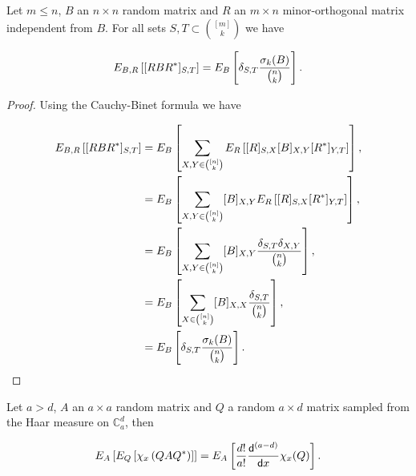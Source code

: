 \begin{lemma} \label{lemma:conjugate_minorth}
    Let $m \le n$, $B$ an $n\times n$ random matrix and $R$ an $m\times n$ minor-orthogonal matrix independent from $B$. For all sets $S,T \subset \binom{[m]}{k}$ we have

    \begin{equation*}
        E_{B,R} \left[ [RBR^*]_{S,T} \right] = E_B \left[\delta_{S,T} \frac{\sigma_k(B)}{\binom{n}k}\right].
    \end{equation*}
\end{lemma}

\begin{proof}
    Using the Cauchy-Binet formula we have

    \begin{align*}
        E_{B,R} \left[ [RBR^*]_{S,T} \right] &= E_B \left[\sum_{X,Y \in \binom{[n]}{k}} E_R \left[ [R]_{S,X} [B]_{X,Y} [R^*]_{Y,T} \right] \right],\\ 
        &= E_B \left[\sum_{X,Y \in \binom{[n]}{k}} [B]_{X,Y} E_R \left[ [R]_{S,X} [R^*]_{Y,T} \right] \right],\\ 
        &=  E_B \left[\sum_{X,Y \in \binom{[n]}{k}} [B]_{X,Y} \frac{\delta_{S,T} \delta_{X,Y}}{\binom{n}{k}} \right],\\ 
        &= E_B \left[\sum_{X \in \binom{[n]}{k}} [B]_{X,X} \frac{\delta_{S,T}}{\binom{n}{k}} \right],\\
        &= E_B \left[\delta_{S,T} \frac{\sigma_k(B)}{\binom{n}k}\right].
    \end{align*}
\end{proof}


\begin{lemma}
    Let $a > d$, $A$ an $a \times a$ random matrix and $Q$ a random $a \times d$ matrix sampled from the Haar measure on $\mathbb C_a^d$, then

    \begin{equation*}
        E_A \left[E_Q\left[ \chi_x \left( Q A Q^* \right) \right]\right] = E_A \left[\frac{d!}{a!} \frac{\mathsf d^{(a-d)}}{\mathsf d x} \chi_x(Q) \right].
    \end{equation*}
\end{lemma}

